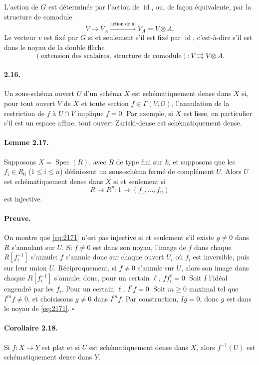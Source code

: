 \documentclass[11pt]{article}
\newcommand{\Spec}{\operatorname{Spec}}
\newcommand{\id}{\operatorname{id}}
\newcommand{\calO}{\mathcal O}
\begin{document}
L'action de $G$ est déterminée par l'action de $\id$, ou, de façon équivalente, par la structure de comodule
\[
V\longrightarrow V_A \xrightarrow{\text{action de }\id} V_A=V\otimes A.
\]
Le vecteur $v$ est fixé par $G$ si et seulement s'il est fixé par $\id$, c'est-à-dire s'il est dans le noyau de la double flèche
\[
(\text{extension des scalaires, structure de comodule}): V \rightrightarrows V\otimes A.
\]

\paragraph{2.16.}
Un sous-schéma ouvert $U$ d'un schéma $X$ est schématiquement dense dans $X$ si, pour tout ouvert $V$ de $X$ et toute section $f\in\Gamma(V,\calO)$, l'annulation de la restriction de $f$ à $U\cap V$ implique $f=0$. Par exemple, si $X$ est lisse, en particulier s'il est un espace affine, tout ouvert Zariski-dense est schématiquement dense.

\paragraph{Lemme 2.17.}
Supposons $X=\Spec(R)$, avec $R$ de type fini sur $k$, et supposons que les $f_i\in R_0$ ($1\leq i\leq n$) définissent un sous-schéma fermé de complément $U$. Alors $U$ est schématiquement dense dans $X$ si et seulement si
\begin{equation}
\label{eq:2171}
R\longrightarrow R^n:1\longmapsto(f_1,\ldots,f_n)
\end{equation}
est injective.

\paragraph{Preuve.}
On montre que \eqref{eq:2171} n'est pas injective si et seulement s'il existe $g\ne0$ dans $R$ s'annulant sur $U$. Si $f\ne0$ est dans son noyau, l'image de $f$ dans chaque $R[f_i^{-1}]$ s'annule: $f$ s'annule donc sur chaque ouvert $U_i$ où $f_i$ est inversible, puis sur leur union $U$. Réciproquement, si $f\ne0$ s'annule sur $U$, alors son image dans chaque $R[f_i^{-1}]$ s'annule; donc, pour un certain $\ell$, $ff_i^\ell=0$. Soit $I$ l'idéal engendré par les $f_i$. Pour un certain $\ell$, $I^\ell f=0$. Soit $m\ge0$ maximal tel que $I^m f\ne0$, et choisissons $g\ne0$ dans $I^m f$. Par construction, $Ig=0$, donc $g$ est dans le noyau de \eqref{eq:2171}. \hfill $\square$

\paragraph{Corollaire 2.18.}
Si $f:X\to Y$ est plat et si $U$ est schématiquement dense dans $X$, alors $f^{-1}(U)$ est schématiquement dense dans $Y$.
\end{document}
